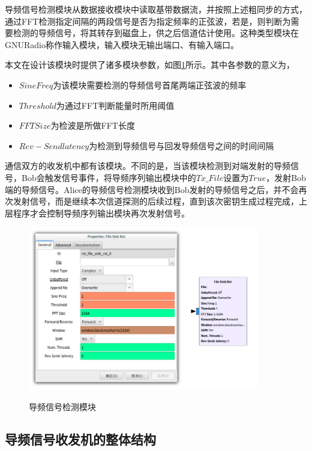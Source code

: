 \documentclass[master]{seuthesis} %
\begin{document}
\begin{Main}
导频信号检测模块从数据接收模块中读取基带数据流，并按照上述粗同步的方式，通过FFT检测指定间隔的两段信号是否为指定频率的正弦波，若是，则判断为需要检测的导频信号，将其转存到磁盘上，供之后信道估计使用。这种类型模块在GNURadio称作输入模块，输入模块无输出端口、有输入端口。

本文在设计该模块时提供了诸多模块参数，如图\ref{file_sink_roi}所示。其中各参数的意义为，

\begin{itemize}
    \item $Sine Freq$为该模块需要检测的导频信号首尾两端正弦波的频率
    \item $Threshold$为通过FFT判断能量时所用阈值
    \item $FFT Size$为检波是所做FFT长度
    \item $Rev-Send latency$为检测到导频信号与回发导频信号之间的时间间隔
\end{itemize}

通信双方的收发机中都有该模块。不同的是，当该模块检测到对端发射的导频信号，Bob会触发信号事件，将导频序列输出模块中的$Tx\_File$设置为$True$，发射Bob端的导频信号。Alice的导频信号检测模块收到Bob发射的导频信号之后，并不会再次发射信号，而是继续本次信道探测的后续过程，直到该次密钥生成过程完成，上层程序才会控制导频序列输出模块再次发射信号。

\begin{figure}
    \centering
    \includegraphics[width=0.9\textwidth]{images/file_sink_roi}
    \caption{导频信号检测模块}{} 
    \label{file_sink_roi}
\end{figure}

\subsection{导频信号收发机的整体结构}


\end{Main}
\end{document}
